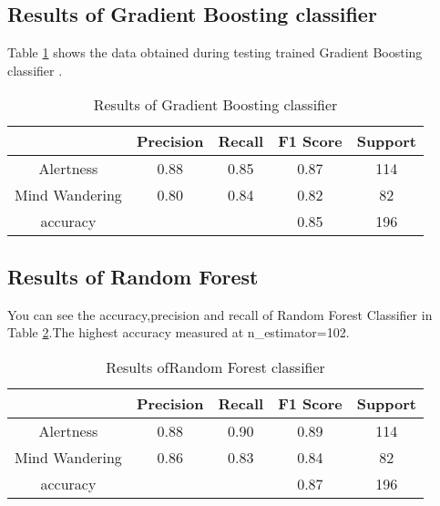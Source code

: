 \subsection{Results of Gradient Boosting classifier }
Table \ref{tab:Gradient_Boosting_classifier_res} shows the data obtained during testing trained Gradient Boosting classifier .
\begin{table}[ht]
    \centering
    \caption{Results of Gradient Boosting classifier }
    {\renewcommand{\arraystretch}{1.2}
    \begin{tabular}{ccccc}
       \hline
       \hline
         & Precision & Recall & F1 Score & Support \\
        \hline
        
         Alertness      & 0.88     & 0.85     & 0.87       &114 \\
         Mind Wandering      & 0.80     & 0.84     & 0.82        &82 \\
    accuracy      &         &           & 0.85       &196 \\
          \hline
          \hline
    \end{tabular}
    }
    \label{tab:Gradient_Boosting_classifier_res}
\end{table}

\subsection{Results of Random Forest }
You can see the accuracy,precision and recall of Random Forest Classifier in Table \ref{tab:rf_res}.The highest accuracy measured at n\_estimator=102. 
\begin{table}[ht]
    \centering
    \caption{Results ofRandom Forest classifier }
    {\renewcommand{\arraystretch}{1.2}
    \begin{tabular}{ccccc}
       \hline
       \hline
         & Precision & Recall & F1 Score & Support \\
        \hline
          Alertness &      0.88     & 0.90  &    0.89      & 114 \\
         Mind Wandering    &   0.86     & 0.83     & 0.84       & 82 \\
    accuracy    &           &           & 0.87      & 196 \\
          \hline
          \hline
    \end{tabular}
    }
    \label{tab:rf_res}
\end{table}

